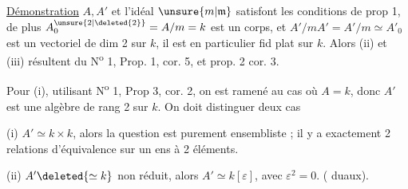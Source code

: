 \uline{Démonstration} \quad $A,A'$ et l'idéal $\unsure{m|\mathfrak m}$ satisfont les conditions de prop 1, de plus $A_0^{\unsure{2|\deleted{2}}}=A/m=k$ est un corps, et $A'/mA'=A'/m\simeq A'_0$ est un vectoriel de dim 2 sur $k$, il est en particulier fid plat sur $k$. Alors (ii) et (iii) résultent du N\textsuperscript{o} 1, Prop. 1, cor. 5, et prop. 2  cor. 3.

Pour (i), utilisant N\textsuperscript{o} 1, Prop 3, cor. 2, on est ramené au cas où $A=k$, donc $A'$ est une algèbre de rang 2 sur $k$.  On doit distinguer deux cas

(i)  $A'\simeq k\times k$, alors la question est purement ensembliste ; il y a exactement 2 relations d'équivalence sur un ens à 2 éléments.

(ii) $A'\deleted{\simeq k}$ non réduit, alors $A'\simeq k[\varepsilon]$, avec $\varepsilon^2=0$. ( duaux).
